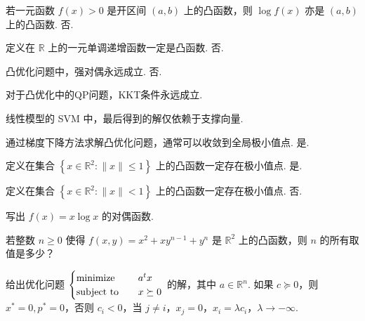 \begin{problem}[判断]
    若一元函数 $f(x) > 0$ 是开区间 $(a, b)$ 上的凸函数，则 $\log f(x)$ 亦是 $(a, b)$ 上的凸函数.
    \Answer 否.
\end{problem}

\begin{problem}[判断]
    定义在 $\mathbb{R}$ 上的一元单调递增函数一定是凸函数.
    \Answer 否.
\end{problem}

\begin{problem}[判断]
    凸优化问题中，强对偶永远成立.
    \Answer 否.
\end{problem}

\begin{problem}[判断]
    对于凸优化中的QP问题，KKT条件永远成立.
    \Answer 
\end{problem}

\begin{problem}[判断]
    线性模型的 SVM 中，最后得到的解仅依赖于支撑向量.
    \Answer 
\end{problem}

\begin{problem}[判断]
    通过梯度下降方法求解凸优化问题，通常可以收敛到全局极小值点.
    \Answer 是.
\end{problem}

\begin{problem}[判断]
    定义在集合 $\left\{x \in \mathbb{R}^2: \|x\| \le 1\right\}$ 上的凸函数一定存在极小值点.
    \Answer 是.
\end{problem}

\begin{problem}[判断]
    定义在集合 $\left\{x \in \mathbb{R}^2: \|x\| < 1\right\}$ 上的凸函数一定存在极小值点.
    \Answer 否.
\end{problem}

\begin{problem}[问答]
    写出 $f(x) = x\log x$ 的对偶函数.
    \Answer 
\end{problem}

\begin{problem}[问答]
    若整数 $n \ge 0$ 使得 $f(x, y) = x^2 + xy^{n - 1} + y^n$ 是 $\mathbb{R}^2$ 上的凸函数，则 $n$ 的所有取值是多少？
    \Answer 
\end{problem}

\begin{problem}[问答]
    给出优化问题 $\begin{cases}
        \operatorname{minimize} \quad & a^tx\\
        \operatorname{subject\ to} \quad & x \succeq 0
    \end{cases}$ 的解，其中 $a\in \mathbb{R}^n$.
    \Answer 如果 $c \succeq 0$，则 $x^* = 0, p^* = 0$，否则 $c_i < 0$，当 $j \neq i$，$x_j = 0$，$x_i = \lambda c_i$，$\lambda \to -\infty$.
\end{problem}

